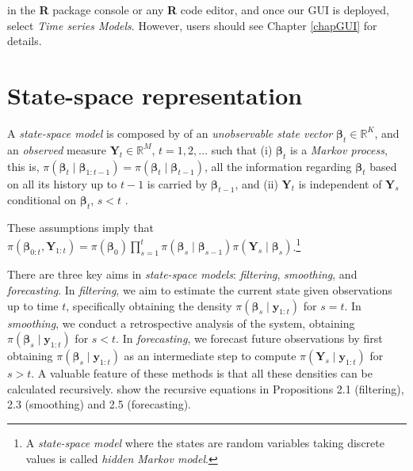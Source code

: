 in the \textbf{R} package console or any \textbf{R} code editor, and once our GUI is deployed, select \textit{Time series Models}. However, users should see Chapter \ref{chapGUI} for details.

\section{State-space representation}\label{sec81}
A \textit{state-space model} is composed by of an \textit{unobservable state vector}  $\bm{\beta}_t \in \mathbb{R}^K$, and an \textit{observed} measure $\bm{Y}_t \in \mathbb{R}^M$, $t=1,2,\dots$ such that (i) $\bm{\beta}_t$ is a \textit{Markov process}, this is, $\pi(\bm{\beta}_t\mid \bm{\beta}_{1:t-1})=\pi(\bm{\beta}_t\mid \bm{\beta}_{t-1})$, all the information regarding $\bm{\beta}_t$ based on all its history up to $t-1$ is carried by $\bm{\beta}_{t-1}$, and (ii) $\bm{Y}_t$ is independent of $\bm{Y}_s$ conditional on $\bm{\beta}_t$, $s < t$ \cite[Chap.~2]{petris2009dynamic}.

These assumptions imply that $\pi(\bm{\beta}_{0:t},\bm{Y}_{1:t})=\pi(\bm{\beta}_0)\prod_{s=1}^{t}\pi(\bm{\beta}_s\mid \bm{\beta}_{s-1})\pi(\bm{Y}_s\mid \bm{\beta}_s)$.\footnote{A \textit{state-space model} where the states are random variables taking discrete values is called \textit{hidden Markov model}.}

There are three key aims in \textit{state-space models}: \textit{filtering}, \textit{smoothing}, and \textit{forecasting}. In \textit{filtering}, we aim to estimate the current state given observations up to time $t$, specifically obtaining the density $\pi(\bm{\beta}_{s}\mid \bm{y}_{1:t})$ for $s = t$. In \textit{smoothing}, we conduct a retrospective analysis of the system, obtaining $\pi(\bm{\beta}_{s}\mid \bm{y}_{1:t})$ for $s < t$. In \textit{forecasting}, we forecast future observations by first obtaining $\pi(\bm{\beta}_{s}\mid \bm{y}_{1:t})$ as an intermediate step to compute $\pi(\bm{Y}_{s}\mid \bm{y}_{1:t})$ for $s > t$. A valuable feature of these methods is that all these densities can be calculated recursively. \cite{petris2009dynamic} show the recursive equations in Propositions 2.1 (filtering), 2.3 (smoothing) and 2.5 (forecasting).

